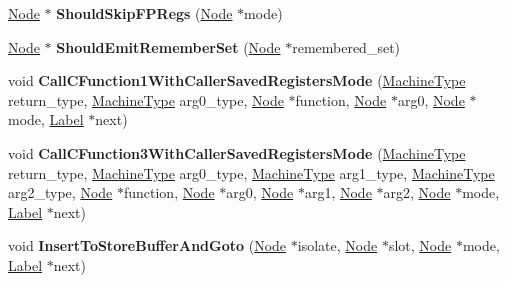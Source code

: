 \begin{DoxyCompactItemize}
\mbox{\hyperlink{classv8_1_1internal_1_1compiler_1_1Node}{Node}} $\ast$ {\bfseries Should\+Skip\+F\+P\+Regs} (\mbox{\hyperlink{classv8_1_1internal_1_1compiler_1_1Node}{Node}} $\ast$mode)
\item 
\mbox{\label{classv8_1_1internal_1_1RecordWriteCodeStubAssembler_a35af23a3dff57db7f5bfc67b78a4dd49}} 
\mbox{\hyperlink{classv8_1_1internal_1_1compiler_1_1Node}{Node}} $\ast$ {\bfseries Should\+Emit\+Remember\+Set} (\mbox{\hyperlink{classv8_1_1internal_1_1compiler_1_1Node}{Node}} $\ast$remembered\+\_\+set)
\item 
\mbox{\label{classv8_1_1internal_1_1RecordWriteCodeStubAssembler_ad89ea5693cd6bc119c28fc80bc45cfba}} 
void {\bfseries Call\+C\+Function1\+With\+Caller\+Saved\+Registers\+Mode} (\mbox{\hyperlink{classv8_1_1internal_1_1MachineType}{Machine\+Type}} return\+\_\+type, \mbox{\hyperlink{classv8_1_1internal_1_1MachineType}{Machine\+Type}} arg0\+\_\+type, \mbox{\hyperlink{classv8_1_1internal_1_1compiler_1_1Node}{Node}} $\ast$function, \mbox{\hyperlink{classv8_1_1internal_1_1compiler_1_1Node}{Node}} $\ast$arg0, \mbox{\hyperlink{classv8_1_1internal_1_1compiler_1_1Node}{Node}} $\ast$mode, \mbox{\hyperlink{classv8_1_1internal_1_1compiler_1_1CodeAssemblerLabel}{Label}} $\ast$next)
\item 
\mbox{\label{classv8_1_1internal_1_1RecordWriteCodeStubAssembler_a1772dd58d550dcb051a9c0824c55e828}} 
void {\bfseries Call\+C\+Function3\+With\+Caller\+Saved\+Registers\+Mode} (\mbox{\hyperlink{classv8_1_1internal_1_1MachineType}{Machine\+Type}} return\+\_\+type, \mbox{\hyperlink{classv8_1_1internal_1_1MachineType}{Machine\+Type}} arg0\+\_\+type, \mbox{\hyperlink{classv8_1_1internal_1_1MachineType}{Machine\+Type}} arg1\+\_\+type, \mbox{\hyperlink{classv8_1_1internal_1_1MachineType}{Machine\+Type}} arg2\+\_\+type, \mbox{\hyperlink{classv8_1_1internal_1_1compiler_1_1Node}{Node}} $\ast$function, \mbox{\hyperlink{classv8_1_1internal_1_1compiler_1_1Node}{Node}} $\ast$arg0, \mbox{\hyperlink{classv8_1_1internal_1_1compiler_1_1Node}{Node}} $\ast$arg1, \mbox{\hyperlink{classv8_1_1internal_1_1compiler_1_1Node}{Node}} $\ast$arg2, \mbox{\hyperlink{classv8_1_1internal_1_1compiler_1_1Node}{Node}} $\ast$mode, \mbox{\hyperlink{classv8_1_1internal_1_1compiler_1_1CodeAssemblerLabel}{Label}} $\ast$next)
\item 
\mbox{\label{classv8_1_1internal_1_1RecordWriteCodeStubAssembler_a8d26444578f4e838344425ef4ec8f05a}} 
void {\bfseries Insert\+To\+Store\+Buffer\+And\+Goto} (\mbox{\hyperlink{classv8_1_1internal_1_1compiler_1_1Node}{Node}} $\ast$isolate, \mbox{\hyperlink{classv8_1_1internal_1_1compiler_1_1Node}{Node}} $\ast$slot, \mbox{\hyperlink{classv8_1_1internal_1_1compiler_1_1Node}{Node}} $\ast$mode, \mbox{\hyperlink{classv8_1_1internal_1_1compiler_1_1CodeAssemblerLabel}{Label}} $\ast$next)
\end{DoxyCompactItemize}
